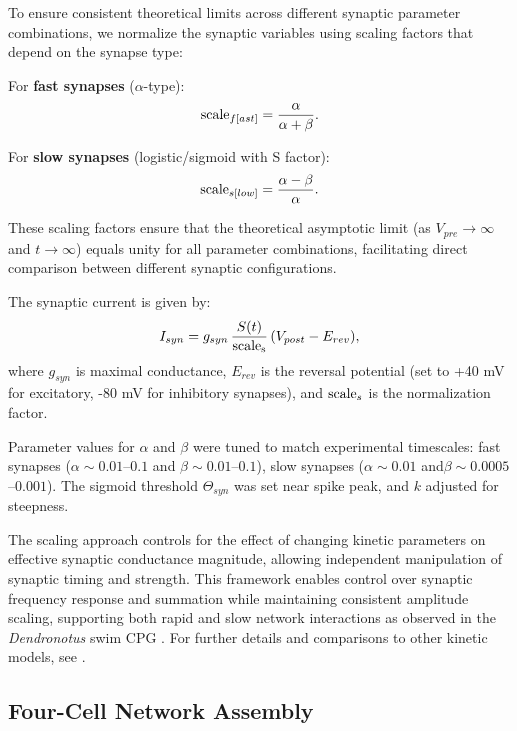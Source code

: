 \documentclass[nofootinbib,aip,amsmath,amssymb,reprint,twocolumn,10pt]{revtex4-2}
\begin{document}
To ensure consistent theoretical limits across different synaptic parameter combinations, we normalize the synaptic variables using scaling factors that depend on the synapse type:

For \textbf{fast synapses} ($\alpha$-type):
\begin{equation}
  {\rm scale}_{f[ast]} = \frac{\alpha}{\alpha + \beta}.
\end{equation}

For \textbf{slow synapses} (logistic/sigmoid with S factor):
\begin{equation}
  {\rm scale}_{s[low]} = \frac{\alpha - \beta}{\alpha}.
\end{equation}

These scaling factors ensure that the theoretical asymptotic limit (as $V_{pre} \to \infty$ and $t \to \infty$) equals unity for all parameter combinations, facilitating direct comparison between different synaptic configurations.

The synaptic current is given by:
\begin{equation}
  I_{syn} = g_{syn}\, \frac{S(t)}{\rm scale_s}\, (V_{post}-E_{rev}),
\end{equation}
where $g_{syn}$ is maximal conductance, $E_{rev}$ is the reversal potential (set to +40 mV for excitatory, -80 mV for inhibitory synapses), and ${\rm scale}_s$ is the normalization factor.

Parameter values for $\alpha$ and $\beta$ were tuned to match experimental timescales: fast synapses ($\alpha \sim 0.01$--$0.1$ and $\beta \sim 0.01$--$0.1$), slow synapses ($\alpha \sim 0.01$ and$\beta \sim 0.0005$--$0.001$). The sigmoid threshold $\Theta_{syn}$ was set near spike peak, and $k$ adjusted for steepness.

The scaling approach controls for the effect of changing kinetic parameters on effective synaptic conductance magnitude, allowing independent manipulation of synaptic timing and strength. This framework enables control over synaptic frequency response and summation while maintaining consistent amplitude scaling, supporting both rapid and slow network interactions as observed in the \textit{Dendronotus} swim CPG \cite{SakuraiKatz2016, scully2024pairing}. For further details and comparisons to other kinetic models, see \cite{destexhe1998kinetic, Hill2001}.

\subsection{Four-Cell Network Assembly}
\end{document}
